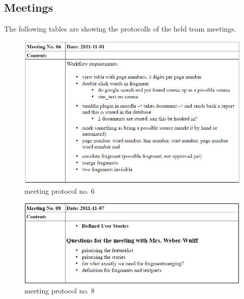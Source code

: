 \begin{appendix}

\chapter{Meetings}\label{ch:Meetings}
The following tables are showing the protocolls of the held team meetings.

\begin{figure}[htbp]
  \centering
    \includegraphics[width=\textwidth]{images/a_meetings/meeting_6}
  \caption{meeting protocol no. 6}
  \label{fig:meeting protocol no. 6}
\end{figure}

\begin{figure}[htbp]
  \centering
    \includegraphics[width=\textwidth]{images/a_meetings/meeting_8}
  \caption{meeting protocol no. 8}
  \label{fig:meeting protocol no. 8}
\end{figure}


\end{appendix}
